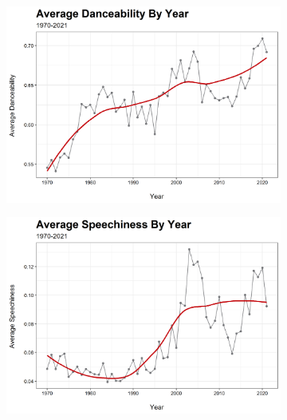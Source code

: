 \documentclass[12pt, twoside]{article}
\begin{document}
\begin{figure}[H]
\begin{subfigure}[b]{0.5\textwidth}
\centering
\includegraphics[width = \textwidth]{track_danceability_trend_.png}
\caption{}
\label{fig:danceability_trend}
\end{subfigure}
\begin{subfigure}[b]{0.5\textwidth}
\centering
\includegraphics[width = \textwidth]{track_speechiness_trend_.png}
\caption{}
\label{fig:speechiness_trend}
\end{subfigure}
\begin{subfigure}[b]{0.5\textwidth}
\centering

\end{subfigure}
\end{figure}
\end{document}
